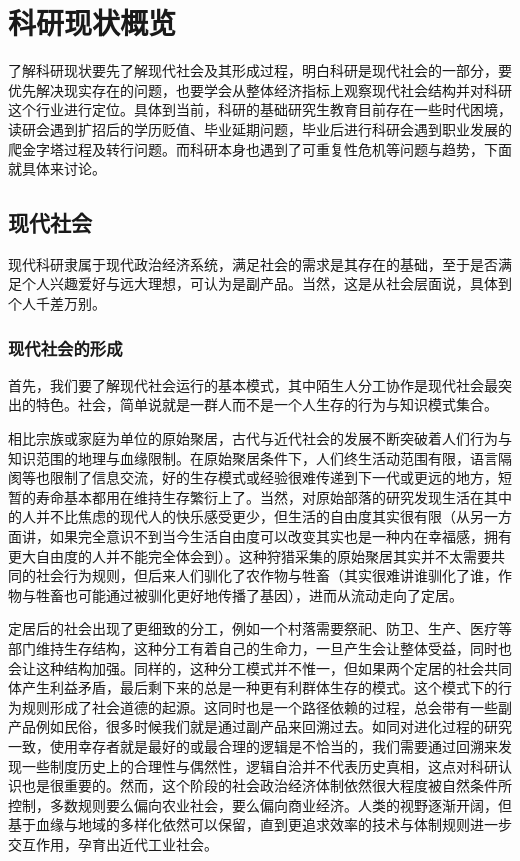 \documentclass[]{tufte-book}
\begin{document}
\hypertarget{view}{%
\chapter{科研现状概览}\label{view}}

了解科研现状要先了解现代社会及其形成过程，明白科研是现代社会的一部分，要优先解决现实存在的问题，也要学会从整体经济指标上观察现代社会结构并对科研这个行业进行定位。具体到当前，科研的基础研究生教育目前存在一些时代困境，读研会遇到扩招后的学历贬值、毕业延期问题，毕业后进行科研会遇到职业发展的爬金字塔过程及转行问题。而科研本身也遇到了可重复性危机等问题与趋势，下面就具体来讨论。

\hypertarget{ux73b0ux4ee3ux793eux4f1a}{%
\section{现代社会}\label{ux73b0ux4ee3ux793eux4f1a}}

现代科研隶属于现代政治经济系统，满足社会的需求是其存在的基础，至于是否满足个人兴趣爱好与远大理想，可认为是副产品。当然，这是从社会层面说，具体到个人千差万别。

\hypertarget{ux73b0ux4ee3ux793eux4f1aux7684ux5f62ux6210}{%
\subsection{现代社会的形成}\label{ux73b0ux4ee3ux793eux4f1aux7684ux5f62ux6210}}

首先，我们要了解现代社会运行的基本模式，其中陌生人分工协作是现代社会最突出的特色。社会，简单说就是一群人而不是一个人生存的行为与知识模式集合。

相比宗族或家庭为单位的原始聚居，古代与近代社会的发展不断突破着人们行为与知识范围的地理与血缘限制。在原始聚居条件下，人们终生活动范围有限，语言隔阂等也限制了信息交流，好的生存模式或经验很难传递到下一代或更远的地方，短暂的寿命基本都用在维持生存繁衍上了。当然，对原始部落的研究发现生活在其中的人并不比焦虑的现代人的快乐感受更少，但生活的自由度其实很有限（从另一方面讲，如果完全意识不到当今生活自由度可以改变其实也是一种内在幸福感，拥有更大自由度的人并不能完全体会到）。这种狩猎采集的原始聚居其实并不太需要共同的社会行为规则，但后来人们驯化了农作物与牲畜（其实很难讲谁驯化了谁，作物与牲畜也可能通过被驯化更好地传播了基因），进而从流动走向了定居。

定居后的社会出现了更细致的分工，例如一个村落需要祭祀、防卫、生产、医疗等部门维持生存结构，这种分工有着自己的生命力，一旦产生会让整体受益，同时也会让这种结构加强。同样的，这种分工模式并不惟一，但如果两个定居的社会共同体产生利益矛盾，最后剩下来的总是一种更有利群体生存的模式。这个模式下的行为规则形成了社会道德的起源。这同时也是一个路径依赖的过程，总会带有一些副产品例如民俗，很多时候我们就是通过副产品来回溯过去。如同对进化过程的研究一致，使用幸存者就是最好的或最合理的逻辑是不恰当的，我们需要通过回溯来发现一些制度历史上的合理性与偶然性，逻辑自洽并不代表历史真相，这点对科研认识也是很重要的。然而，这个阶段的社会政治经济体制依然很大程度被自然条件所控制，多数规则要么偏向农业社会，要么偏向商业经济。人类的视野逐渐开阔，但基于血缘与地域的多样化依然可以保留，直到更追求效率的技术与体制规则进一步交互作用，孕育出近代工业社会。
\end{document}
